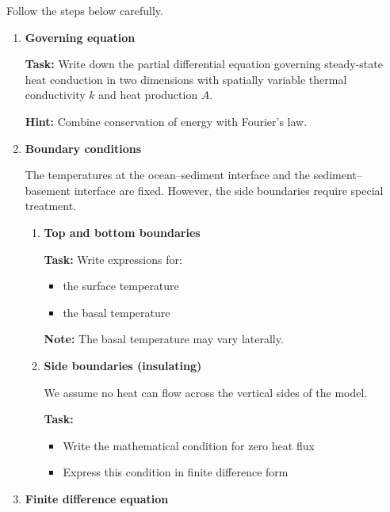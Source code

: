 \documentclass[final,a4paper,12pt]{article}
\begin{document}
Follow the steps below carefully.

\bigskip

\begin{enumerate}

\item \textbf{Governing equation}

\textbf{Task:} Write down the partial differential equation governing steady-state
heat conduction in two dimensions with spatially variable thermal conductivity
$k$ and heat production $A$.

\textbf{Hint:} Combine conservation of energy with Fourier's law.

\bigskip

\item \textbf{Boundary conditions}

The temperatures at the ocean--sediment interface and the sediment--basement
interface are fixed. However, the side boundaries require special treatment.

\begin{enumerate}

\item \textbf{Top and bottom boundaries}

\textbf{Task:} Write expressions for:
\begin{itemize}
    \item the surface temperature
    \item the basal temperature
\end{itemize}

\textbf{Note:} The basal temperature may vary laterally.

\medskip

\item \textbf{Side boundaries (insulating)}

We assume no heat can flow across the vertical sides of the model.

\textbf{Task:}
\begin{itemize}
    \item Write the mathematical condition for zero heat flux
    \item Express this condition in finite difference form
\end{itemize}

\end{enumerate}

\bigskip

\item \textbf{Finite difference equation}


\end{enumerate}
\end{document}
